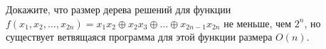 Докажите, что размер дерева решений для функции $f(x_1, x_2, \dots, x_{2n}) = x_1x_2 \oplus x_2x_3 \oplus \dots \oplus x_{2n - 1}x_{2n}$ не
меньше, чем $2^n$, но существует ветвящаяся программа для этой функции размера $O(n)$. 